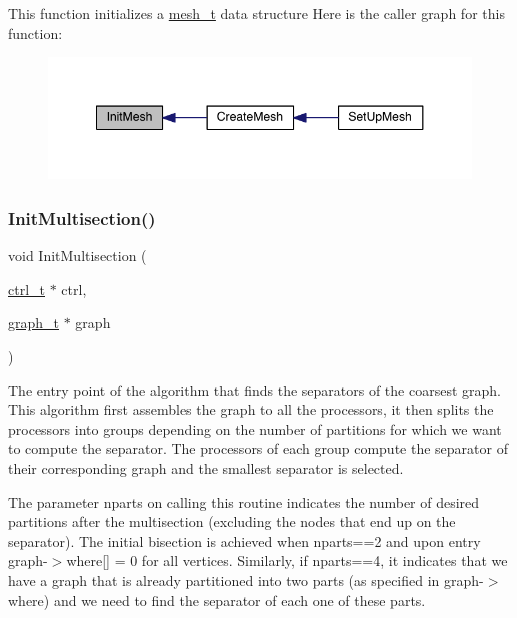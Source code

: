 This function initializes a \hyperlink{a00738}{mesh\+\_\+t} data structure Here is the caller graph for this function\+:\nopagebreak
\begin{figure}[H]
\begin{center}
\leavevmode
\includegraphics[width=348pt]{a00951_a82cd62ea70eaae4395fee538d40cf12b_icgraph}
\end{center}
\end{figure}
\mbox{\label{a00951_ae5b482d2dc0a65057e8d69e57773279a}} 
\subsubsection{\texorpdfstring{Init\+Multisection()}{InitMultisection()}}
{\footnotesize\ttfamily void Init\+Multisection (\begin{DoxyParamCaption}\item[{\hyperlink{a00742}{ctrl\+\_\+t} $\ast$}]{ctrl,  }\item[{\hyperlink{a00734}{graph\+\_\+t} $\ast$}]{graph }\end{DoxyParamCaption})}

The entry point of the algorithm that finds the separators of the coarsest graph. This algorithm first assembles the graph to all the processors, it then splits the processors into groups depending on the number of partitions for which we want to compute the separator. The processors of each group compute the separator of their corresponding graph and the smallest separator is selected.

The parameter nparts on calling this routine indicates the number of desired partitions after the multisection (excluding the nodes that end up on the separator). The initial bisection is achieved when nparts==2 and upon entry graph-\/$>$where\mbox{[}\mbox{]} = 0 for all vertices. Similarly, if nparts==4, it indicates that we have a graph that is already partitioned into two parts (as specified in graph-\/$>$where) and we need to find the separator of each one of these parts.

